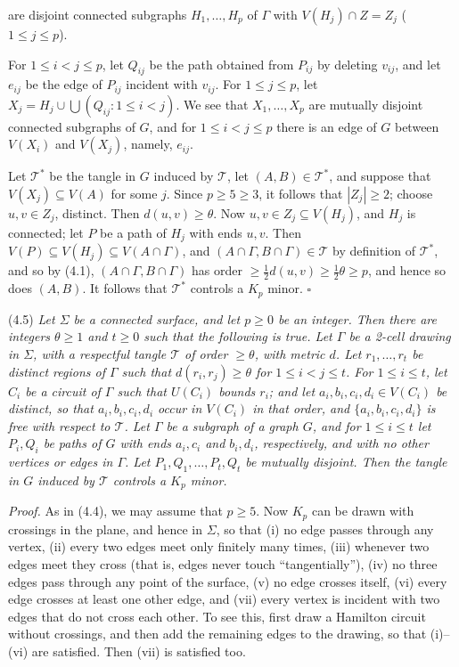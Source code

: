 \noindent are disjoint connected subgraphs $H_1, \dots, H_p$ of $\Gamma$ with $V(H_j) \cap Z = Z_j$ ($1 \le j \le p$).

For $1 \le i < j \le p$, let $Q_{ij}$ be the path obtained from $P_{ij}$ by deleting $v_{ij}$, and let $e_{ij}$ be the edge of $P_{ij}$ incident with $v_{ij}$. For $1 \le j \le p$, let $X_j = H_j \cup \bigcup (Q_{ij} \colon 1 \le i < j)$. We see that $X_1, \dots, X_p$ are mutually disjoint connected subgraphs of $G$, and for $1 \le i < j \le p$ there is an edge of $G$ between $V(X_i)$ and $V(X_j)$, namely, $e_{ij}$.

Let $\mathscr{T}^*$ be the tangle in $G$ induced by $\mathscr{T}$, let $(A, B) \in \mathscr{T}^*$, and suppose that $V(X_j) \subseteq V(A)$ for some $j$. Since $p \ge 5 \ge 3$, it follows that $|Z_j| \ge 2$; choose $u, v \in Z_j$, distinct. Then $d(u, v) \ge \theta$. Now $u, v \in Z_j \subseteq V(H_j)$, and $H_j$ is connected; let $P$ be a path of $H_j$ with ends $u, v$. Then $V(P) \subseteq V(H_j) \subseteq V(A \cap \Gamma)$, and $(A \cap \Gamma, B \cap \Gamma) \in \mathscr{T}$ by definition of $\mathscr{T}^*$, and so by (4.1), $(A \cap \Gamma, B \cap \Gamma)$ has order $\ge \frac{1}{2} d(u, v) \ge \frac{1}{2} \theta \ge p$, and hence so does $(A, B)$. It follows that $\mathscr{T}^*$ controls a $K_p$ minor. $\square$

\stmt
(4.5) \textit{Let $\Sigma$ be a connected surface, and let $p \ge 0$ be an integer. Then there are integers $\theta \ge 1$ and $t \ge 0$ such that the following is true. Let $\Gamma$ be a 2-cell drawing in $\Sigma$, with a respectful tangle $\mathscr{T}$ of order $\ge \theta$, with metric $d$. Let $r_1, \dots, r_t$ be distinct regions of $\Gamma$ such that $d(r_i, r_j) \ge \theta$ for $1 \le i < j \le t$. For $1 \le i \le t$, let $C_i$ be a circuit of $\Gamma$ such that $U(C_i)$ bounds $r_i$; and let $a_i, b_i, c_i, d_i \in V(C_i)$ be distinct, so that $a_i, b_i, c_i, d_i$ occur in $V(C_i)$ in that order, and $\{a_i, b_i, c_i, d_i\}$ is free with respect to $\mathscr{T}$. Let $\Gamma$ be a subgraph of a graph $G$, and for $1 \le i \le t$ let $P_i, Q_i$ be paths of $G$ with ends $a_i, c_i$ and $b_i, d_i$, respectively, and with no other vertices or edges in $\Gamma$. Let $P_1, Q_1, \dots, P_t, Q_t$ be mutually disjoint. Then the tangle in $G$ induced by $\mathscr{T}$ controls a $K_p$ minor.}

\textit{Proof.} As in (4.4), we may assume that $p \ge 5$. Now $K_p$ can be drawn with crossings in the plane, and hence in $\Sigma$, so that (i) no edge passes through any vertex, (ii) every two edges meet only finitely many times, (iii) whenever two edges meet they cross (that is, edges never touch ``tangentially''), (iv) no three edges pass through any point of the surface, (v) no edge crosses itself, (vi) every edge crosses at least one other edge, and (vii) every vertex is incident with two edges that do not cross each other. To see this, first draw a Hamilton circuit without crossings, and then add the remaining edges to the drawing, so that (i)--(vi) are satisfied. Then (vii) is satisfied too.

